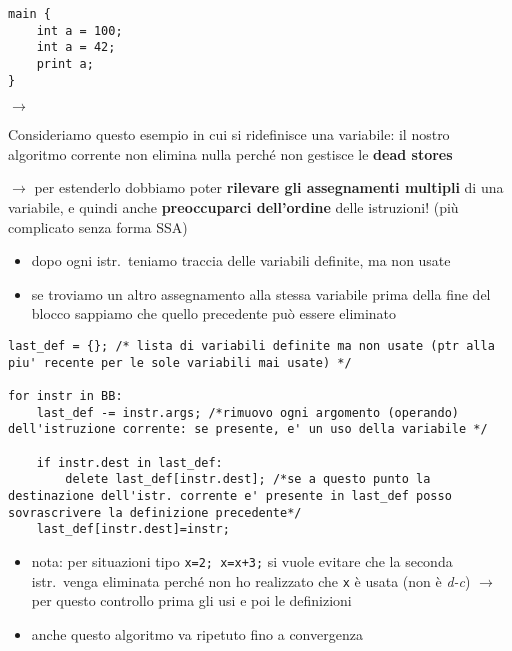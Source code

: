 \noindent\begin{minipage}[c]{.3\textwidth}
\begin{lstlisting}
main {
	int a = 100;
	int a = 42;
	print a;
}\end{lstlisting}
\end{minipage}\hfill $\rightarrow$ \hfill
\begin{minipage}[c]{.62\textwidth}
Consideriamo questo esempio in cui si ridefinisce una variabile: il nostro algoritmo corrente non elimina nulla perch\'e non gestisce le \textbf{dead stores}
\end{minipage}

\noindent $\rightarrow$ per estenderlo dobbiamo poter \textbf{rilevare gli assegnamenti multipli} di una variabile, e quindi anche \textbf{preoccuparci dell'ordine} delle istruzioni! (pi\`u complicato senza forma SSA)

\begin{itemize}
  \item dopo ogni istr.~teniamo traccia delle variabili definite, ma non usate
  \item se troviamo un altro assegnamento alla stessa variabile prima della fine del blocco sappiamo che quello precedente pu\`o essere eliminato
\end{itemize}

\begin{lstlisting}
last_def = {}; /* lista di variabili definite ma non usate (ptr alla piu' recente per le sole variabili mai usate) */

for instr in BB:
	last_def -= instr.args; /*rimuovo ogni argomento (operando) dell'istruzione corrente: se presente, e' un uso della variabile */

	if instr.dest in last_def:
		delete last_def[instr.dest]; /*se a questo punto la destinazione dell'istr. corrente e' presente in last_def posso sovrascrivere la definizione precedente*/
	last_def[instr.dest]=instr;\end{lstlisting}

\begin{itemize}
  \item nota: per situazioni tipo \lstinline|x=2; x=x+3;| si vuole evitare che la seconda istr.~venga eliminata perch\'e non ho realizzato che \lstinline|x| \`e usata (non \`e \textit{d-c}) $\rightarrow$ per questo controllo prima gli usi e poi le definizioni
  \item anche questo algoritmo va ripetuto fino a convergenza
\end{itemize}


